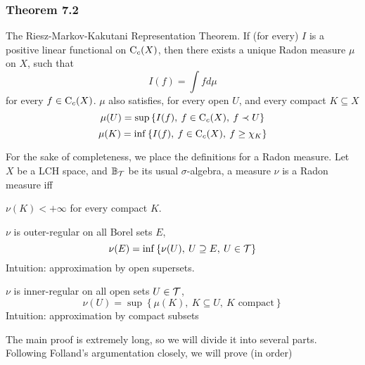 \documentclass[../../main.tex]{subfiles}
\begin{document}
\subsubsection*{Theorem 7.2}

\begin{wts}
    The Riesz-Markov-Kakutani Representation Theorem. If (for every) $I$ is a positive linear functional on $\operatorname{C}_c({X})$, then there exists a unique Radon measure $\mu$ on $X$, such that
    \[
    I(f) = \int fd\mu
    \]
    for every $f\in\operatorname{C}_c({X})$. $\mu$ also satisfies, for every open $U$, and every compact $K\subseteq X$
    \begin{equation}\label{open approximated by If}
        \mu(U) = \sup\left\{I(f),\:f\in\operatorname{C}_c({X}),\:f\prec U\right\}
    \end{equation}
    \begin{equation}\label{compact approximated by If}
        \mu(K)=\inf\left\{I(f),\:f\in\operatorname{C}_c({X}),\:f\geq\chi_K\right\}
    \end{equation}
\end{wts}
\newcommand{\borel}{\mathbb{B}_{\Tau}} %
\newcommand{\mustar}{\mu^*} %
%
For the sake of completeness, we place the definitions for a Radon measure. Let $X$ be a LCH space, and $\borel$ be its usual $\sigma$-algebra, a measure $\nu$ is a Radon measure iff
\begin{enumroman}
    \item $\nu(K)<+\infty$ for every compact $K$.
    \item $\nu$ is outer-regular on all Borel sets $E$,
    \[
    \nu(E) = \inf\left\{\nu(U),\: U\supseteq E,\:U\in\mathcal{T}\right\}
    \]
    Intuition: approximation by open supersets.
    \item $\nu$ is inner-regular on all open sets $U\in\mathcal{T}$,
    \[
    \nu(U) = \sup\left\{\mu(K),\: K\subseteq U,\:K\text{ compact}\right\}
    \]
    Intuition: approximation by compact subsets 
\end{enumroman}
%
%
The main proof is extremely long, so we will divide it into several parts. Following Folland's argumentation closely, we will prove (in order)
%
%
\end{document}

